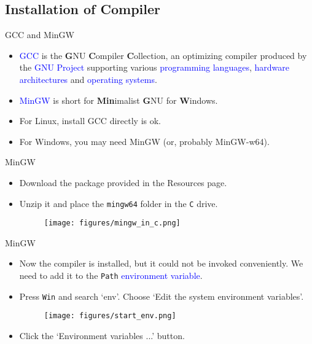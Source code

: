 \documentclass{beamer}
\newcommand{\blue}[1]{\textcolor{blue}{#1}}
\begin{document}
\subsection{Installation of Compiler}

\begin{frame}{GCC and MinGW}
    \begin{itemize}
        \item \blue{GCC} is the \textbf{G}NU \textbf{C}ompiler \textbf{C}ollection, an optimizing compiler produced by the \blue{GNU Project} supporting various \blue{programming languages}, \blue{hardware architectures} and \blue{operating systems}.
        \item \blue{MinGW} is short for \textbf{Min}imalist \textbf{G}NU for \textbf{W}indows.
        \pause
        \item For Linux, install GCC directly is ok.
        \item For Windows, you may need MinGW (or, probably MinGW-w64).
    \end{itemize}
\end{frame}

\begin{frame}{MinGW}
    \begin{itemize}
        \item Download the package provided in the Resources page.
        \item Unzip it and place the \texttt{mingw64} folder in the \texttt{C} drive.
        \begin{figure}[h]
            \centering
            \texttt{[image: figures/mingw\_in\_c.png]}
        \end{figure}
    \end{itemize}
\end{frame}

\begin{frame}{MinGW}
    \begin{itemize}
        \item Now the compiler is installed, but it could not be invoked conveniently. We need to add it to the \texttt{Path} \blue{environment variable}.
        \item Press \texttt{Win} and search `env'. Choose `Edit the system environment variables'.
        \begin{figure}[h]
            \centering
            \texttt{[image: figures/start\_env.png]}
        \end{figure}
        \item Click the `Environment variables ...' button.
    \end{itemize}
\end{frame}
\end{document}
